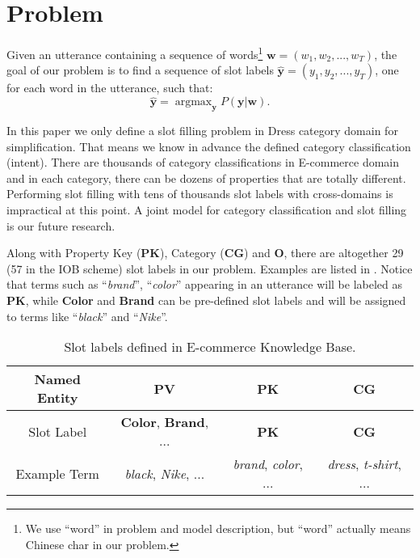 \section{Problem}
\label{sec:problem}
Given an utterance containing a sequence of
words\footnote{We use ``word'' in problem and model description,
	but ``word'' actually means Chinese char in our problem.} 
$\textbf{w} = (w_1, w_2, ..., w_T)$,
the goal of our problem
is to find a sequence of slot labels $\hat{\textbf{y}} = (y_1, y_2, ..., y_T)$, 
one for each word in the utterance, such that:
\begin{equation*}
	\hat{\textbf{y}} = \mathop{\arg\max}_{\textbf{y}}P(\textbf{y}|\textbf{w}).
\end{equation*}

In this paper we only define a slot filling problem in Dress category domain for simplification.
That means we know in advance the defined category classification (intent).
There are thousands of category classifications in E-commerce domain
and in each category, there can be dozens of properties that 
are totally different.  Performing slot filling with tens of thousands 
slot labels with cross-domains is impractical at this point.
A joint model for category classification and slot filling is 
our future research.

Along with Property Key (\textbf{PK}), Category (\textbf{CG}) and \textbf{O},
there are altogether 29 (57 in the IOB scheme) slot labels in our problem. 
Examples are listed in .
Notice that terms such as ``\emph{brand}'', ``\emph{color}''
appearing in an utterance
will be labeled as \textbf{PK},
while \textbf{Color} and \textbf{Brand} can be pre-defined slot labels
and will be assigned to terms like
``\emph{black}'' and ``\emph{Nike}''.
\begin{table}[htbp]
	\centering
	\scriptsize
	\begin{tabular}{c|c|c|c}
		\toprule
		Named Entity & PV & PK & CG \\
		\midrule
		Slot Label & \textbf{Color}, \textbf{Brand}, ... & \textbf{PK} & \textbf{CG} \\
		\midrule
		Example Term & \emph{black}, \emph{Nike}, ... & \emph{brand}, \emph{color}, ... & \emph{dress}, \emph{t-shirt}, ... \\
		\bottomrule
	\end{tabular}
	\caption{Slot labels defined in E-commerce Knowledge Base.}
	\label{slot-labels}
	\vspace{-10pt}
\end{table}


